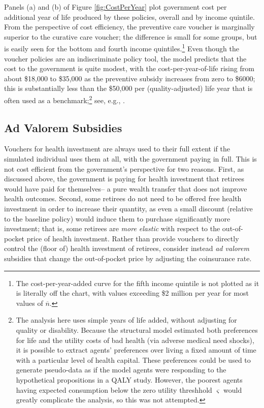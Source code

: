 \documentclass[12pt,pdftex,letterpaper]{article}
\newcommand{\Invst}{n}
\newcommand{\LifeUtility}{\varsigma}
\begin{document}
Panels (a) and (b) of Figure \ref{fig:CostPerYear} plot government cost per additional year of life produced by these policies, overall and by income quintile.  From the perspective of cost efficiency, the preventive care voucher is marginally superior to the curative care voucher; the difference is small for some groups, but is easily seen for the bottom and fourth income quintiles.\footnote{The cost-per-year-added curve for the fifth income quintile is not plotted as it is literally off the chart, with values exceeding \$2 million per year for most values of $\overline{\Invst}$.}  Even though the voucher policies are an indiscriminate policy tool, the model predicts that the cost to the government is quite modest, with the cost-per-year-of-life rising from about \$18,000 to \$35,000 as the preventive subsidy increases from zero to \$6000; this is substantially less than the \$50,000 per (quality-adjusted) life year that is often used as a benchmark;\footnote{The analysis here uses simple years of life added, without adjusting for quality or disability.  Because the structural model estimated both preferences for life and the utility costs of bad health (via adverse medical need shocks), it is possible to extract agents' preferences over living a fixed amount of time with a particular level of health capital. These preferences could be used to generate pseudo-data as if the model agents were responding to the hypothetical propositions in a QALY study.  However, the poorest agents having expected consumption below the zero utility threshhold $\LifeUtility$ would greatly complicate the analysis, so this was not attempted.} see, e.g., \cite{neumann14}.


\subsection{Ad Valorem Subsidies}
\label{sec:AdValorem}

Vouchers for health investment are always used to their full extent if the simulated individual uses them at all, with the government paying in full.  This is not cost efficient from the government's perspective for two reasons.  First, as discussed above, the government is paying for health investment that retirees would have paid for themselves-- a pure wealth transfer that does not improve health outcomes.  Second, some retirees do not need to be offered free health investment in order to increase their quantity, as even a small discount (relative to the baseline policy) would induce them to purchase significantly more investment; that is, some retirees are \textit{more elastic} with respect to the out-of-pocket price of health investment.  Rather than provide vouchers to directly control the (floor of) health investment of retirees, consider instead \textit{ad valorem} subsidies that change the out-of-pocket price by adjusting the coinsurance rate.
\end{document}
